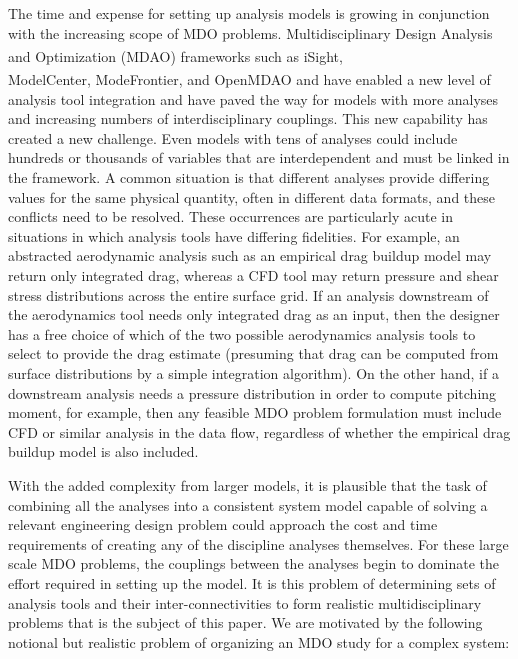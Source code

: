     The time and expense for setting up 
    analysis models is growing in conjunction with the increasing scope of MDO problems. 
    Multidisciplinary Design Analysis and Optimization (MDAO)
    frameworks such as iSight\textsuperscript{\textregistered},\\ ModelCenter\textsuperscript{\textregistered}, ModeFrontier\textsuperscript{\textregistered}, and OpenMDAO\cite{Gray2012} and have enabled a new level of analysis tool integration 
    and have paved the way for models with more analyses and increasing numbers of interdisciplinary couplings. This 
    new capability has created a new challenge. Even models with tens of analyses could include hundreds or thousands
    of variables that are interdependent and must be linked in the framework. 
    A common situation is that different analyses provide differing values for the 
    same physical quantity, often in different data formats, and these conflicts need to be resolved. 
    These occurrences are particularly acute in situations in which analysis tools have differing fidelities. For
    example, an abstracted aerodynamic analysis such as an empirical drag buildup model may return only
    integrated drag, whereas a CFD tool may return pressure and shear stress distributions across the entire
    surface grid. If an analysis downstream of the aerodynamics tool needs only integrated drag as an input,
    then the designer has a free choice of which of the two possible aerodynamics analysis tools to select to
    provide the drag estimate (presuming that drag can be computed from surface distributions by a simple
    integration algorithm). On the other hand, if a downstream analysis needs a pressure distribution in
    order to compute pitching moment, for example, then any feasible MDO problem formulation must
    include CFD or similar analysis in the data flow, regardless of whether the empirical drag buildup model
    is also included.

    With the added complexity from larger models, it is plausible that the task of combining all the analyses into a 
    consistent system model capable of solving a relevant engineering design 
    problem could approach the cost and time requirements of creating any of the discipline 
    analyses themselves. For these large scale MDO problems, the couplings between the 
    analyses begin to dominate the effort required in setting up the model. It is this problem of 
    determining sets of analysis tools and their inter-connectivities to form realistic
    multidisciplinary problems that is the subject of this paper. We are motivated by the following notional
    but realistic problem of organizing an MDO study for a complex system:


